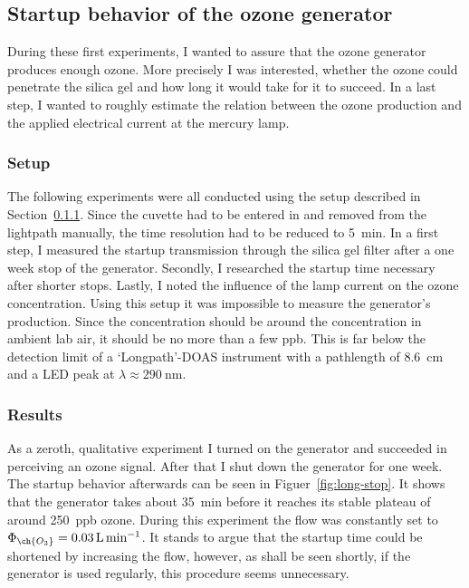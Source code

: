 \subsection{Startup behavior of the ozone generator}
\label{sec:ozone}

During these first experiments, I wanted to assure that the ozone
generator produces enough ozone. More precisely I was interested,
whether the ozone could penetrate the silica gel and how long it would
take for it to succeed. In a last step, I wanted to roughly estimate
the relation between the ozone production and the applied electrical
current at the mercury lamp.

\subsubsection{Setup}
\label{sec:ozone-setup}

The following experiments were all conducted using the setup described
in Section~\ref{sec:ozone-setup}. Since the cuvette had to be entered
in and removed from the lightpath manually, the time resolution had to
be reduced to \SI{5}{\minute}. In a first step, I measured the startup
 transmission through the silica gel filter after a one week
stop of the generator. Secondly, I researched the startup time
necessary after shorter stops. Lastly, I noted the influence of the
lamp current on the ozone concentration. Using this setup it was
impossible to measure the generator's  production. Since the
concentration should be around the  concentration in ambient
lab air, it should be no more than a few \si{ppb}. This is far below
the detection limit of a `Longpath'-DOAS instrument with a pathlength
of \SI{8.6}{\centi\meter} and a LED peak at $\lambda \approx
\SI{290}{\nano\meter}$.

\subsubsection{Results}
\label{sec:ozone-results}

As a zeroth, qualitative experiment I turned on the generator
and succeeded in perceiving an ozone signal. After that I shut down the generator
for one week. The startup behavior afterwards can be seen in
Figuer~\ref{fig:long-stop}. It shows that the generator takes about
\SI{35}{\minute} before it reaches its stable plateau of around
\SI{250}{ppb} ozone. During this experiment the flow was constantly
set to $\Phi_{\ch{O_3}} = \SI{0.03}{\liter\per\minute}$. It stands to
argue that the startup time could be shortened by increasing the flow,
however, as shall be seen shortly, if the
generator is used regularly, this procedure seems unnecessary.

